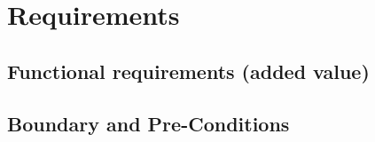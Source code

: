 \section{Requirements}

\subsection{Functional requirements (added value)}


\subsection{Boundary and Pre-Conditions}

